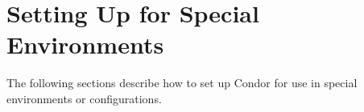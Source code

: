 \section{\label{sec:special-environments}Setting Up for Special
Environments} 

The following sections describe how to set up Condor for use in
special environments or configurations.








%




%



